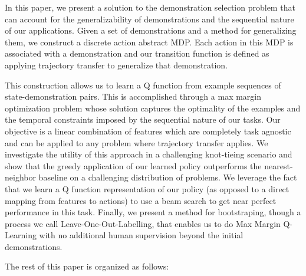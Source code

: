 In this paper, we present a solution to the demonstration selection problem that can account for the generalizability of demonstrations and the sequential nature of our applications.
Given a set of demonstrations and a method for generalizing them, we construct a discrete action abstract MDP.
Each action in this MDP is associated with a demonstration and our transition function is defined as applying trajectory transfer to generalize that demonstration.

This construction allows us to learn a Q function from example sequences of state-demonstration pairs.
This is accomplished through a max margin optimization problem whose solution captures the optimality of the examples and the temporal constraints imposed by the sequential nature of our tasks.
Our objective is a linear combination of features which are completely task agnostic and can be applied to any problem where trajectory transfer applies. 
We investigate the utility of this approach in a challenging knot-tieing scenario and show that the greedy application of our learned policy outperforms the nearest-neighbor baseline on a challenging distribution of problems. 
We leverage the fact that we learn a Q function representation of our policy (as opposed to a direct mapping from features to actions) to use a beam search to get near perfect performance in this task.
Finally, we present a method for bootstraping, though a process we call Leave-One-Out-Labelling, that enables us to do Max Margin Q-Learning with no additional human supervision beyond the initial demonstrations.

The rest of this paper is organized as follows: 


